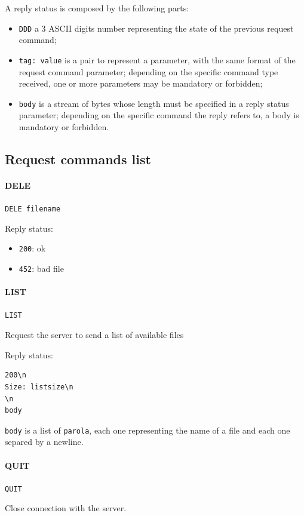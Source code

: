 \documentclass[a4paper,12pt]{article}
\begin{document}
A reply status is composed by the following parts:
\begin{itemize}
  \item \texttt{DDD} a 3 ASCII digits number representing the state of the previous request command;
  \item \texttt{tag: value} is a pair to represent a parameter, with the same format of the request command parameter; depending on the specific command type received, one or more parameters may be mandatory or forbidden;
  \item \texttt{body} is a stream of bytes whose length must be specified in a reply status parameter; depending on the specific command the reply refers to, a body is mandatory or forbidden.
\end{itemize}

\subsection{Request commands list}

\paragraph{DELE}
\texttt{DELE filename}

Reply status:
\begin{itemize}
  \item \texttt{200}: ok
  \item \texttt{452}: bad file
\end{itemize}

\paragraph{LIST}
\texttt{LIST}

Request the server to send a list of available files

Reply status:
\begin{verbatim}
200\n
Size: listsize\n
\n
body
\end{verbatim}

\texttt{body} is a list of \texttt{parola}, each one representing the name of a file and each one separed by a newline.

\paragraph{QUIT}
\texttt{QUIT}

Close connection with the server.
\end{document}
